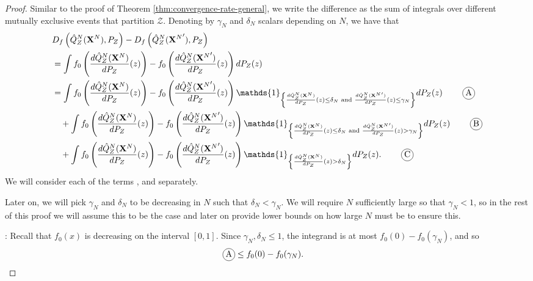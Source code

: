 \begin{proof}
Similar to the proof of Theorem \ref{thm:convergence-rate-general},
we write the difference as the sum of integrals over different mutually exclusive events that partition $\mathcal{Z}$.
Denoting by $\gamma_N$ and $\delta_N$ scalars depending on $N$, we have that
%
\begin{align*}
    & D_f\left( \hat{Q}_Z^N(\XN) , P_Z\right) - D_f\left( \hat{Q}_Z^N({\XN}') , P_Z\right)  \\
    &= \int f_0\left( \frac{d\hat{Q}_Z^N(\XN)}{dP_Z}(z) \right) - f_0\left( \frac{d\hat{Q}_Z^N({\XN}')}{dP_Z}(z) \right) dP_Z(z)  \\
    &= \int f_0\left( \frac{d\hat{Q}_Z^N(\XN)}{dP_Z}(z) \right) - f_0\left( \frac{d\hat{Q}_Z^N({\XN}')}{dP_Z}(z) \right) \mathds{1}_{\left\lbrace \frac{d\hat{Q}_Z^N(\XN)}{dP_Z}(z) \leq \delta_N \text{ and } \frac{d\hat{Q}_Z^N({\XN}')}{dP_Z}(z) \leq \gamma_N \right\rbrace} dP_Z(z) \tag*{\encircle{A}}\\
    & \quad + \int f_0\left( \frac{d\hat{Q}_Z^N(\XN)}{dP_Z}(z) \right) - f_0\left( \frac{d\hat{Q}_Z^N({\XN}')}{dP_Z}(z) \right) \mathds{1}_{\left\lbrace \frac{d\hat{Q}_Z^N(\XN)}{dP_Z}(z) \leq \delta_N \text{ and } \frac{d\hat{Q}_Z^N({\XN}')}{dP_Z}(z) > \gamma_N \right\rbrace} dP_Z(z) \tag*{\encircle{B}}\\
    & \quad + \int f_0\left( \frac{d\hat{Q}_Z^N(\XN)}{dP_Z}(z) \right) - f_0\left( \frac{d\hat{Q}_Z^N({\XN}')}{dP_Z}(z) \right) \mathds{1}_{\left\lbrace \frac{d\hat{Q}_Z^N(\XN)}{dP_Z}(z) > \delta_N \right\rbrace} dP_Z(z). \tag*{\encircle{C}}
\end{align*}
%
We will consider each of the terms ,  and   separately.

Later on, we will pick $\gamma_N$ and $\delta_N$ to be decreasing in $N$ such that $\delta_N < \gamma_N$.
We will require $N$ sufficiently large so that $\gamma_N< 1$, so in the rest of this proof we will assume this to be the case and later on provide lower bounds on how large $N$ must be to ensure this.

: 
Recall that $f_0(x)$ is decreasing on the interval $[0,1]$.
Since $\gamma_N, \delta_N \leq 1$, 
the integrand is at most $f_0(0) - f_0(\gamma_N)$, and so 
\begin{align*}
    \encircle{A} &\leq f_0(0) - f_0(\gamma_N).
\end{align*}



\end{proof}
